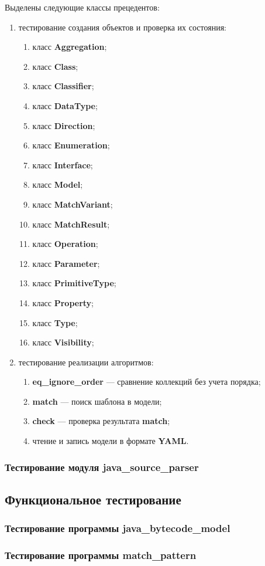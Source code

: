 Выделены следующие классы прецедентов:
\begin{enumerate}
    \item тестирование создания объектов и проверка их состояния:
    \begin{enumerate}
        \item класс \textbf{Aggregation};
        \item класс \textbf{Class};
        \item класс \textbf{Classifier};
        \item класс \textbf{DataType};
        \item класс \textbf{Direction};
        \item класс \textbf{Enumeration};
        \item класс \textbf{Interface};
        \item класс \textbf{Model};
        \item класс \textbf{MatchVariant};
        \item класс \textbf{MatchResult};
        \item класс \textbf{Operation};
        \item класс \textbf{Parameter};
        \item класс \textbf{PrimitiveType};
        \item класс \textbf{Property};
        \item класс \textbf{Type};
        \item класс \textbf{Visibility};
    \end{enumerate}
    \item тестирование реализации алгоритмов:
    \begin{enumerate}
        \item \textbf{eq\_ignore\_order} --- сравнение коллекций без учета порядка;
        \item \textbf{match} --- поиск шаблона в модели;
        \item \textbf{check} --- проверка результата \textbf{match};
        \item чтение и запись модели в формате \textbf{YAML}.
    \end{enumerate}
\end{enumerate}

\subsubsection{Тестирование модуля java\_source\_parser}

\subsection{Функциональное тестирование}

\subsubsection{Тестирование программы java\_bytecode\_model}

\subsubsection{Тестирование программы match\_pattern}
